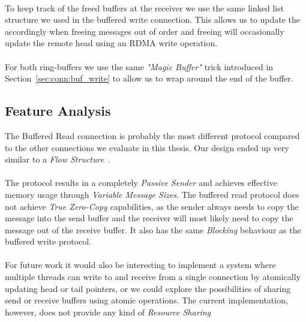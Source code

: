 \paragraph{} To keep track of the freed buffers at the receiver we use the same linked list structure we used in the buffered
write connection. This allows us to update the  accordingly when freeing messages out of order and freeing will
occasionally update the remote head using an RDMA write operation.

\paragraph{} For both ring-buffers we use the same \emph{"Magic Buffer"} trick introduced in Section~\ref{sec:conn:buf_write} to 
allow us to wrap around the end of the buffer.

\subsection{Feature Analysis}
The Buffered Read connection is probably the most different protocol compared to the other connections we evaluate in this
thesis. Our design ended up very similar to a \emph{Flow Structure}~\cite{sharma2020design}.

\paragraph{} The protocol results in a completely \emph{Passive Sender} and achieves effective memory usage through \emph{Variable Message Sizes}.
The buffered read protocol does not achieve \emph{True Zero-Copy} capabilities, as the sender always needs to copy the 
message into the send buffer and the receiver will most likely need to copy the message out of the receive buffer. It also
has the same \emph{Blocking} behaviour as the buffered write protocol.


\paragraph{} For future work it would also be interesting to implement a system where multiple threads can write to and receive 
from a single  connection by atomically updating head or tail pointers, or we could explore the possibilities of sharing send or
receive buffers using atomic operations. The current implementation, however, does not provide any kind of \emph{Resource Sharing}
